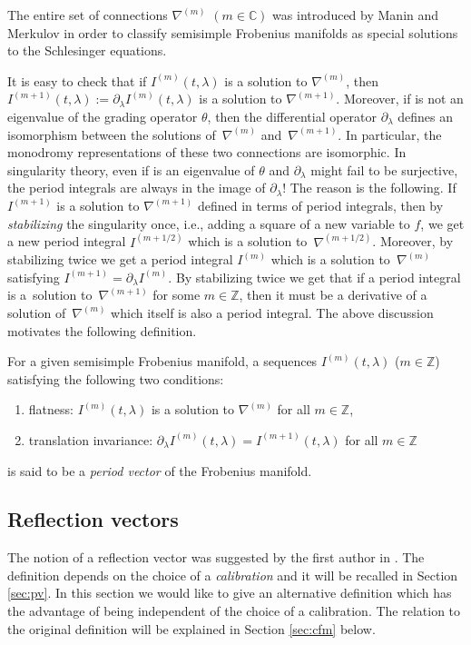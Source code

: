 \documentclass[10pt,a4paper]{article}
\numberwithin{equation}{section}
\newcommand{\CC}{\mathbb{C}}
\newcommand{\ZZ}{\mathbb{Z}}
\begin{document}
\begin{Remark}
The entire set of connections $\nabla^{(m)}$ $(m\in \CC)$ was introduced by Manin and
Merkulov \cite{MM1997} in order to classify semisimple Frobenius
manifolds as special solutions to the Schlesinger equations.
\end{Remark}

It is easy to check that if $I^{(m)}(t,\lambda)$ is a solution
to $\nabla^{(m)}$, then $I^{(m+1)}(t,\lambda):=\partial_\lambda
I^{(m)}(t,\lambda)$ is a solution to $\nabla^{(m+1)}$. Moreover, if
 is not an eigenvalue of the grading operator
$\theta$, then the differential
operator $\partial_\lambda$ defines an isomorphism between the
solutions of~$\nabla^{(m)}$ and~$\nabla^{(m+1)}$. In particular, the
monodromy representations of these two connections are isomorphic.
In singularity theory, even if  is an eigenvalue of
$\theta$ and $\partial_\lambda$ might fail to be surjective, the
period integrals are always in the image of $\partial_\lambda$! The
reason is the following. If
$I^{(m+1)}$ is a solution to $\nabla^{(m+1)}$ defined in terms
of period integrals, then by {\em stabilizing} the singularity once,
i.e., adding a square of a new variable to $f$, we get a new period
integral $I^{(m+1/2)}$ which is a solution to~$\nabla^{(m+1/2)}$. Moreover, by stabilizing twice we get a period
integral $I^{(m)}$ which is a solution to~$\nabla^{(m)}$ satisfying
$I^{(m+1)}=\partial_\lambda I^{(m)}$. By stabilizing twice
we get that if a period integral is a~solution to~$\nabla^{(m+1)}$ for
some $m\in \ZZ$, then it must be a derivative of a solution of~$\nabla^{(m)}$ which itself is also a period integral.
The above discussion motivates the following definition.
\begin{Definition}\label{def:pv}
For a given semisimple Frobenius manifold,
a sequences $I^{(m)}(t,\lambda)$ ($m\in \ZZ$) satisfying the
following two conditions:
\begin{enumerate}\itemsep=0pt
\item[(i)] flatness:
 $I^{(m)}(t,\lambda)$ is a solution to $\nabla^{(m)}$ for all
 $m\in \ZZ$,
\item[(ii)] translation invariance:
 $\partial_\lambda I^{(m)}(t,\lambda)=I^{(m+1)}(t,\lambda)$ for all
 $m\in \ZZ$
\end{enumerate}
is said to be a {\em period vector} of the Frobenius manifold.
\end{Definition}

\subsection{Reflection vectors}
The notion of a reflection vector was suggested by the first author in
\cite{Milanov:p2}. The definition depends on the choice of a {\em
 calibration} and it will be recalled in Section \ref{sec:pv}. In
this section we would like to give an alternative definition which has
the advantage of being independent of the choice of a calibration. The
relation to the original definition will be explained in Section
\ref{sec:cfm} below.
\end{document}
